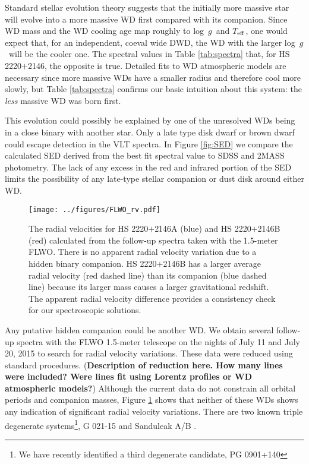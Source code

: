 \documentclass{emulateapj}
\newcommand{\Teff}{\ifmmode {T_{\rm eff} }\else $T_{\rm eff}$\fi}
\newcommand{\logg}{\ifmmode {{\rm log}\ g }\else log~$g$\fi}
\begin{document}
Standard stellar evolution theory suggests that the initially more massive star will evolve into a more massive WD first compared with its companion. Since WD mass and the WD cooling age map roughly to \logg\ and \Teff, one would expect that, for an independent, coeval wide DWD, the WD with the larger \logg\ will be the cooler one. The spectral values in Table \ref{tab:spectra} that, for HS 2220$+$2146, the opposite is true. Detailed fits to WD atmospheric models are necessary since more massive WDs have a smaller radius and therefore cool more slowly, but Table \ref{tab:spectra} confirms our basic intuition about this system: the {\it less} massive WD was born first.


This evolution could possibly be explained by one of the unresolved WDs being in a close binary with another star. Only a late type disk dwarf or brown dwarf could escape detection in the VLT spectra. In Figure \ref{fig:SED} we compare the calculated SED derived from the best fit spectral value to SDSS and 2MASS photometry. The lack of any excess in the red and infrared portion of the SED limits the possibility of any late-type stellar companion or dust disk around either WD. 

\begin{figure}[b]
\begin{center}
\texttt{[image: ../figures/FLWO\_rv.pdf]}
\caption{ The radial velocities for HS 2220$+$2146A (blue) and HS 2220$+$2146B (red) calculated from the follow-up spectra taken with the 1.5-meter FLWO. There is no apparent radial velocity variation due to a hidden binary companion. HS 2220$+$2146B has a larger average radial velocity (red dashed line) than its companion (blue dashed line) because its larger mass causes a larger gravitational redshift. The apparent radial velocity difference provides a consistency check for our spectroscopic solutions.}
\label{fig:rv}
\end{center}
\end{figure}


Any putative hidden companion could be another WD. We obtain several follow-up spectra with the FLWO 1.5-meter telescope on the nights of July 11 and July 20, 2015 to search for radial velocity variations. These data were reduced using standard procedures. ({\bf Description of reduction here. How many lines were included? Were lines fit using Lorentz profiles or WD atmospheric models?}) Although the current data do not constrain all orbital periods and companion masses, Figure \ref{fig:rv} shows that neither of these WDs shows any indication of significant radial velocity variations. There are two known triple degenerate systems\footnote{We have recently identified a third degenerate candidate, PG 0901+140}, G 021-15 \citep{farihi05} and Sanduleak A/B \citep{maxted00}.
\end{document}
